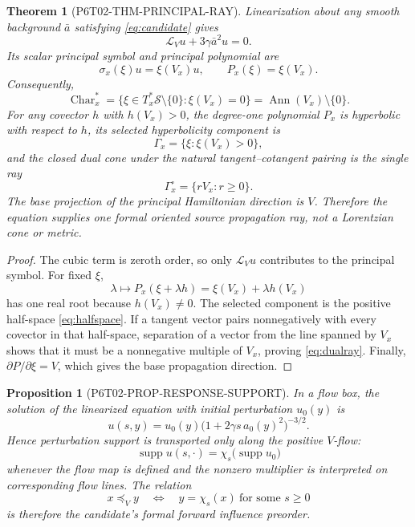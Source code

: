 \documentclass[11pt]{article}
\newtheorem{theorem}{Theorem}
\newtheorem{proposition}{Proposition}
\newcommand{\Sub}{\mathcal S}
\newcommand{\Lie}{\mathcal L}
\newcommand{\Char}{\operatorname{Char}}
\newcommand{\Ann}{\operatorname{Ann}}
\newcommand{\supp}{\operatorname{supp}}
\begin{document}
\begin{theorem}[P6T02-THM-PRINCIPAL-RAY]
\label{thm:principal}
Linearization about any smooth background \(\bar a\) satisfying
\eqref{eq:candidate} gives
\[
 \Lie_Vu+3\gamma\bar a^2u=0.
\tag{4}\label{eq:linearized}
\]
Its scalar principal symbol and principal polynomial are
\[
 \sigma_x(\xi)u=\xi(V_x)u,
 \qquad
 P_x(\xi)=\xi(V_x).
\tag{5}\label{eq:principal}
\]
Consequently,
\[
 \Char_x^*=\{\xi\in T_x^*\Sub\setminus\{0\}:\xi(V_x)=0\}
 =\Ann(V_x)\setminus\{0\}.
\tag{6}\label{eq:char}
\]
For any covector \(h\) with \(h(V_x)>0\), the degree-one polynomial
\(P_x\) is hyperbolic with respect to \(h\), its selected hyperbolicity
 component is
\[
 \Gamma_x=\{\xi:\xi(V_x)>0\},
\tag{7}\label{eq:halfspace}
\]
and the closed dual cone under the natural tangent--cotangent pairing is the
single ray
\[
 \Gamma_x^\circ=\{rV_x:r\geq0\}.
\tag{8}\label{eq:dualray}
\]
The base projection of the principal Hamiltonian direction is \(V\).
Therefore the equation supplies one formal oriented source propagation ray,
not a Lorentzian cone or metric.
\end{theorem}

\begin{proof}
The cubic term is zeroth order, so only \(\Lie_Vu\) contributes to the
principal symbol.  For fixed \(\xi\),
\[
 \lambda\longmapsto P_x(\xi+\lambda h)
 =\xi(V_x)+\lambda h(V_x)
\]
has one real root because \(h(V_x)\neq0\).  The selected component is the
positive half-space \eqref{eq:halfspace}.  If a tangent vector pairs
nonnegatively with every covector in that half-space, separation of a vector
from the line spanned by \(V_x\) shows that it must be a nonnegative multiple
of \(V_x\), proving \eqref{eq:dualray}.  Finally,
\(\partial P/\partial\xi=V\), which gives the base propagation direction.
\end{proof}

\begin{proposition}[P6T02-PROP-RESPONSE-SUPPORT]
\label{prop:response}
In a flow box, the solution of the linearized equation with initial
perturbation \(u_0(y)\) is
\[
 u(s,y)=u_0(y)
 \bigl(1+2\gamma s\,a_0(y)^2\bigr)^{-3/2}.
\tag{9}\label{eq:response}
\]
Hence perturbation support is transported only along the positive \(V\)-flow:
\[
 \supp u(s,\cdot)
 =\chi_s\bigl(\supp u_0\bigr)
\]
whenever the flow map is defined and the nonzero multiplier is interpreted
on corresponding flow lines.  The relation
\[
 x\preceq_V y
 \quad\Longleftrightarrow\quad
 y=\chi_s(x)\ \text{for some }s\geq0
\tag{10}\label{eq:preorder}
\]
is therefore the candidate's formal forward influence preorder.
\end{proposition}
\end{document}
